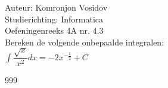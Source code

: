 \documentclass[a4paper]{article}
\newcommand{\dint}{\displaystyle\int}
\begin{document}
	
	\noindent \large Auteur: Komronjon Vosidov \\
	\noindent \large Studierichting: Informatica\\
	\noindent \large Oefeningenreeks 4A nr. 4.3\\
	
	
	\medskip
	\normalsize
	Bereken de volgende onbepaalde integralen:\\
	
$ \dint \dfrac{\sqrt{x}}{x^2} dx = -2 x^{-\tfrac{1}{2}} + C $
	
	
	
	
	
	
	
	\begin{thebibliography}{999}
	\end{thebibliography}		
\end{document}

